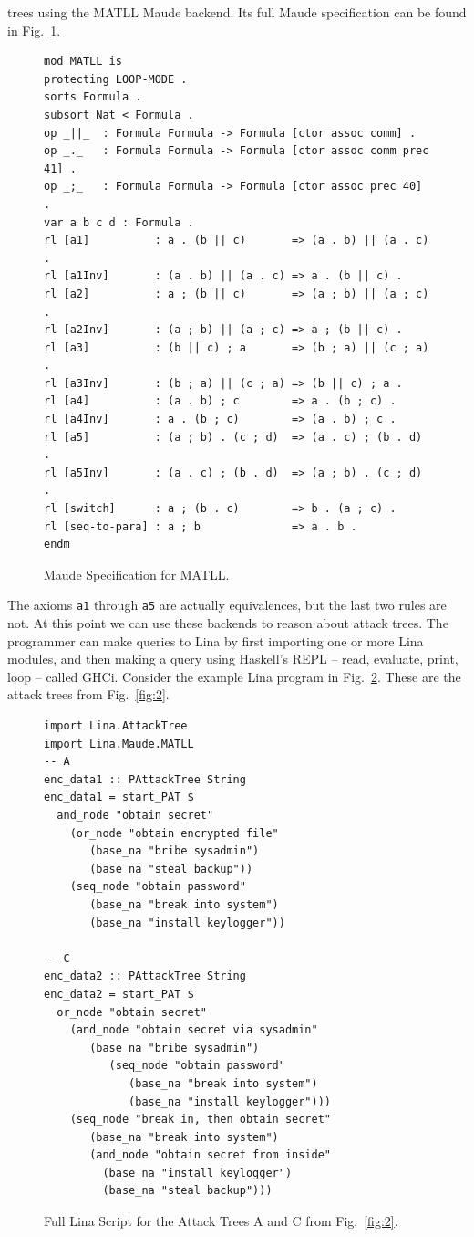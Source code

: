 \documentclass{llncs}
\begin{document}
trees using the MATLL Maude backend.  Its full Maude specification can
be found in Fig.~\ref{fig:maude-spec-matll}.
\begin{figure}
\begin{mdframed}
\scriptsize
\begin{verbatim}
mod MATLL is
protecting LOOP-MODE .
sorts Formula .
subsort Nat < Formula .
op _||_  : Formula Formula -> Formula [ctor assoc comm] .
op _._   : Formula Formula -> Formula [ctor assoc comm prec 41] .
op _;_   : Formula Formula -> Formula [ctor assoc prec 40] .
var a b c d : Formula .
rl [a1]          : a . (b || c)       => (a . b) || (a . c) .
rl [a1Inv]       : (a . b) || (a . c) => a . (b || c) .
rl [a2]          : a ; (b || c)       => (a ; b) || (a ; c) .
rl [a2Inv]       : (a ; b) || (a ; c) => a ; (b || c) .
rl [a3]          : (b || c) ; a       => (b ; a) || (c ; a) .
rl [a3Inv]       : (b ; a) || (c ; a) => (b || c) ; a .
rl [a4]          : (a . b) ; c        => a . (b ; c) .
rl [a4Inv]       : a . (b ; c)        => (a . b) ; c .
rl [a5]          : (a ; b) . (c ; d)  => (a . c) ; (b . d) .
rl [a5Inv]       : (a . c) ; (b . d)  => (a ; b) . (c ; d) .
rl [switch]      : a ; (b . c)        => b . (a ; c) .
rl [seq-to-para] : a ; b              => a . b .
endm      
\end{verbatim}
\end{mdframed}
  \caption{Maude Specification for MATLL.}
  \label{fig:maude-spec-matll}
\end{figure}
The axioms \verb!a1! through \verb!a5! are actually equivalences, but
the last two rules are not.  At this point we can use these backends
to reason about attack trees.
The programmer can make queries to Lina by first importing one or more
Lina modules, and then making a query using Haskell's REPL -- read,
evaluate, print, loop -- called GHCi.  Consider the example Lina
program in Fig.~\ref{fig:lina-script-encrypt}. These are the attack
trees from Fig.~\ref{fig:2}.
\begin{figure}
  \begin{mdframed}
\begin{verbatim}
import Lina.AttackTree
import Lina.Maude.MATLL
-- A
enc_data1 :: PAttackTree String
enc_data1 = start_PAT $
  and_node "obtain secret"
    (or_node "obtain encrypted file"
       (base_na "bribe sysadmin")
       (base_na "steal backup"))
    (seq_node "obtain password"
       (base_na "break into system")
       (base_na "install keylogger"))

-- C
enc_data2 :: PAttackTree String
enc_data2 = start_PAT $
  or_node "obtain secret"
    (and_node "obtain secret via sysadmin"
       (base_na "bribe sysadmin")
          (seq_node "obtain password"
             (base_na "break into system")
             (base_na "install keylogger")))
    (seq_node "break in, then obtain secret"
       (base_na "break into system")
       (and_node "obtain secret from inside"
         (base_na "install keylogger")
         (base_na "steal backup")))
    \end{verbatim}
  \end{mdframed}
  \caption{Full Lina Script for the Attack Trees A and C from Fig.~\ref{fig:2}.}
  \label{fig:lina-script-encrypt}
\end{figure}
\end{document}
